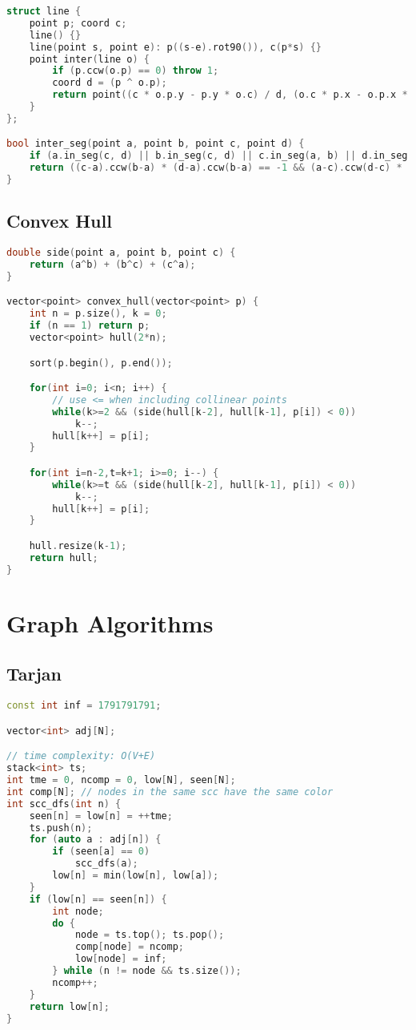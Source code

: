\documentclass{article}
\begin{document}
\begin{lstlisting}[language=C++]
struct line {
    point p; coord c;
    line() {}
    line(point s, point e): p((s-e).rot90()), c(p*s) {}
    point inter(line o) {
        if (p.ccw(o.p) == 0) throw 1;
        coord d = (p ^ o.p);
        return point((c * o.p.y - p.y * o.c) / d, (o.c * p.x - o.p.x * c) / d);
    }
};

bool inter_seg(point a, point b, point c, point d) {
    if (a.in_seg(c, d) || b.in_seg(c, d) || c.in_seg(a, b) || d.in_seg(a, b)) return true;
    return ((c-a).ccw(b-a) * (d-a).ccw(b-a) == -1 && (a-c).ccw(d-c) * (b-c).ccw(d-c) == -1);
}\end{lstlisting}
\subsection{Convex Hull}
\begin{lstlisting}[language=C++]
double side(point a, point b, point c) {
	return (a^b) + (b^c) + (c^a);
}

vector<point> convex_hull(vector<point> p) {
	int n = p.size(), k = 0;
	if (n == 1) return p;
	vector<point> hull(2*n);

	sort(p.begin(), p.end());

	for(int i=0; i<n; i++) {
		// use <= when including collinear points
		while(k>=2 && (side(hull[k-2], hull[k-1], p[i]) < 0))
			k--;
		hull[k++] = p[i];
	}

	for(int i=n-2,t=k+1; i>=0; i--) {
		while(k>=t && (side(hull[k-2], hull[k-1], p[i]) < 0))
			k--;
		hull[k++] = p[i];
	}

	hull.resize(k-1);
	return hull;
}
\end{lstlisting}
\section{Graph Algorithms}
\subsection{Tarjan}
\begin{lstlisting}[language=C++]
const int inf = 1791791791;

vector<int> adj[N];

// time complexity: O(V+E)
stack<int> ts;
int tme = 0, ncomp = 0, low[N], seen[N];
int comp[N]; // nodes in the same scc have the same color
int scc_dfs(int n) {
	seen[n] = low[n] = ++tme;
	ts.push(n);
	for (auto a : adj[n]) {
		if (seen[a] == 0)
			scc_dfs(a);
		low[n] = min(low[n], low[a]);
	}
	if (low[n] == seen[n]) {
		int node;
		do {
			node = ts.top(); ts.pop();
			comp[node] = ncomp;
			low[node] = inf;
		} while (n != node && ts.size());
		ncomp++;
	}
	return low[n];
}\end{lstlisting}
\end{document}
